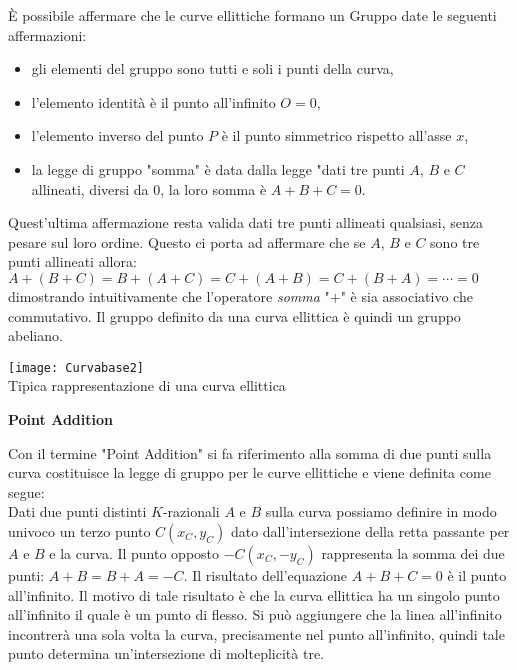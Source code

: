 \documentclass[a4paper,12pt]{tesiinfo}
\begin{document}
\`E possibile affermare che le curve ellittiche formano un Gruppo date le seguenti affermazioni:
\begin{itemize}
    \item gli elementi del gruppo sono tutti e soli i punti della curva,
    \item l'elemento identit\`a \`e il punto all'infinito $O = 0$,
    \item l'elemento inverso del punto $P$ \`e il punto simmetrico rispetto all'asse $x$,
    \item la legge di gruppo "somma" \`e data dalla legge "dati tre punti $A$, $B$ e $C$ allineati, diversi da $0$, la loro somma \`e $A+B+C=0$.
\end{itemize}
Quest'ultima affermazione resta valida dati tre punti allineati qualsiasi, senza pesare sul loro ordine. Questo ci porta ad affermare che se $A$, $B$ e $C$ sono tre punti allineati allora:\\
$A+(B+C)=B+(A+C)=C+(A+B)=C+(B+A)=\cdots = 0$\\
dimostrando intuitivamente che l'operatore \textit{somma} "$+$" \`e sia associativo che commutativo. Il gruppo definito da una curva ellittica \`e quindi un gruppo abeliano.
\begin{center}
\texttt{[image: Curvabase2]}
\\
Tipica rappresentazione di una curva ellittica
\\
\end{center}
\begin{center}
\textbf{Point Addition}
\end{center}
Con il termine "Point Addition" si fa riferimento alla somma di due punti sulla curva costituisce la legge di gruppo per le curve ellittiche e viene definita come segue: 
\\
Dati due punti distinti $K$-razionali $A$ e $B$ sulla curva possiamo definire in modo univoco un terzo punto $C(x_C, y_C)$ dato dall'intersezione della retta passante per $A$ e $B$ e la curva. Il punto opposto $-C(x_C, -y_C)$ rappresenta la somma dei due punti: $A + B = B+ A = -C$. Il risultato dell'equazione $A+B+C = 0$ \`e il punto all'infinito. Il motivo di tale risultato \`e che la curva ellittica ha un singolo punto all'infinito il quale \`e un punto di flesso. Si pu\`o aggiungere che la linea all'infinito incontrer\`a una sola volta la curva, precisamente nel punto all'infinito, quindi tale punto determina un'intersezione di molteplicit\`a tre.
\end{document}
